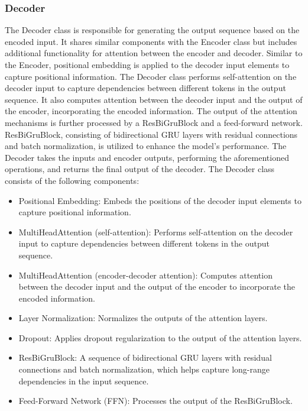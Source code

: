 \documentclass[a4paper, noexaminfo]{sapthesis}
\begin{document}
\subsubsection{Decoder}
The Decoder class is responsible for generating the output sequence 
based on the encoded input. It shares similar components with the Encoder 
class but includes additional functionality for attention between the 
encoder and decoder. Similar to the Encoder, positional embedding 
is applied to the decoder input elements to capture positional information.
 The Decoder class performs self-attention on the 
decoder input to capture dependencies between different tokens in the 
output sequence. It also computes attention between the decoder input 
and the output of the encoder, incorporating the encoded information. 
The output of the attention mechanisms is further processed by a 
ResBiGruBlock and a 
feed-forward network. ResBiGruBlock, 
consisting of bidirectional GRU layers with residual connections 
and batch normalization, is utilized to enhance the model's performance. 
The Decoder takes the inputs and encoder outputs, performing the 
aforementioned operations, and returns the final output of the decoder. 
The Decoder class consists of the following components:
\begin{itemize}
  \item Positional Embedding: Embeds the positions of the decoder input 
  elements to capture positional information.
  \item MultiHeadAttention (self-attention): Performs self-attention on 
  the decoder input to capture dependencies between different tokens in the output sequence.
  \item MultiHeadAttention (encoder-decoder attention): Computes attention 
  between the decoder input and the output of the encoder to incorporate 
  the encoded information.
  \item Layer Normalization: Normalizes the outputs of the attention
   layers.
  \item Dropout: Applies dropout regularization to the output of the 
  attention layers.
  \item ResBiGruBlock: A sequence of bidirectional GRU layers with 
  residual connections and batch normalization, which helps capture
    long-range dependencies in the input sequence.
  \item Feed-Forward Network (FFN): Processes the output of the ResBiGruBlock.
\end{itemize}
\end{document}
